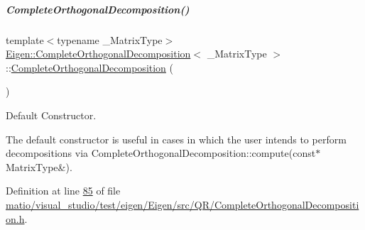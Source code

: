 \mbox{\label{group___q_r___module_a7ba33814fd3fdc62f6179cdcd655c679}} 
\subparagraph{\texorpdfstring{Complete\+Orthogonal\+Decomposition()}{CompleteOrthogonalDecomposition()}\hspace{0.1cm}{\footnotesize\ttfamily [5/8]}}
{\footnotesize\ttfamily template$<$typename \+\_\+\+Matrix\+Type$>$ \\
\hyperlink{group___q_r___module_class_eigen_1_1_complete_orthogonal_decomposition}{Eigen\+::\+Complete\+Orthogonal\+Decomposition}$<$ \+\_\+\+Matrix\+Type $>$\+::\hyperlink{group___q_r___module_class_eigen_1_1_complete_orthogonal_decomposition}{Complete\+Orthogonal\+Decomposition} (\begin{DoxyParamCaption}{ }\end{DoxyParamCaption})\hspace{0.3cm}{\ttfamily [inline]}}



Default Constructor. 

The default constructor is useful in cases in which the user intends to perform decompositions via {\ttfamily Complete\+Orthogonal\+Decomposition\+::compute(const$\ast$ Matrix\+Type\&)}. 

Definition at line \hyperlink{matio_2visual__studio_2test_2eigen_2_eigen_2src_2_q_r_2_complete_orthogonal_decomposition_8h_source_l00085}{85} of file \hyperlink{matio_2visual__studio_2test_2eigen_2_eigen_2src_2_q_r_2_complete_orthogonal_decomposition_8h_source}{matio/visual\+\_\+studio/test/eigen/\+Eigen/src/\+Q\+R/\+Complete\+Orthogonal\+Decomposition.\+h}.

